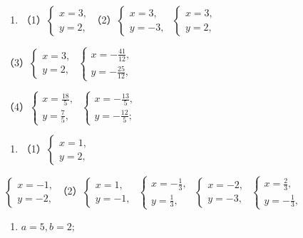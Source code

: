 \begin{enumerate}[start=5]
\item
  （1）\(\left\{ \begin{array}{l} x = 3, \\ y = 2, \end{array} \right.\)（2）\(\left\{ \begin{array}{l} x = 3, \\ y = -3, \end{array} \right.\) \(\left\{ \begin{array}{l} x = 3, \\ y = 2, \end{array} \right.\)
\end{enumerate}

（3）\(\left\{ \begin{array}{l} x = 3, \\ y = 2, \end{array} \right.\) \(\left\{ \begin{array}{l} x = -\frac{41}{12}, \\ y = -\frac{25}{12}, \end{array} \right.\)

（4）\(\left\{ \begin{array}{l} x = \frac{18}{5}, \\ y = \frac{7}{5}, \end{array} \right.\) \(\left\{ \begin{array}{l} x = -\frac{13}{5}, \\ y = -\frac{12}{5}; \end{array} \right.\)

\begin{enumerate}[start=6]
\item
  （1）\(\left\{ \begin{array}{l} x = 1, \\ y = 2, \end{array} \right.\)
\end{enumerate}

\(\left\{ \begin{array}{l} x = -1, \\ y = -2, \end{array} \right.\)（2）\(\left\{ \begin{array}{l} x = 1, \\ y = -1, \end{array} \right.\) \(\left\{ \begin{array}{l} x = -\frac{1}{3}, \\ y = \frac{1}{3}, \end{array} \right.\) \(\left\{ \begin{array}{l} x = -2, \\ y = -3, \end{array} \right.\) \(\left\{ \begin{array}{l} x = \frac{2}{3}, \\ y = -\frac{1}{3}, \end{array} \right.\)
\begin{enumerate}[start=7]
\item
  \(a = 5, b = 2;\)
\end{enumerate}

